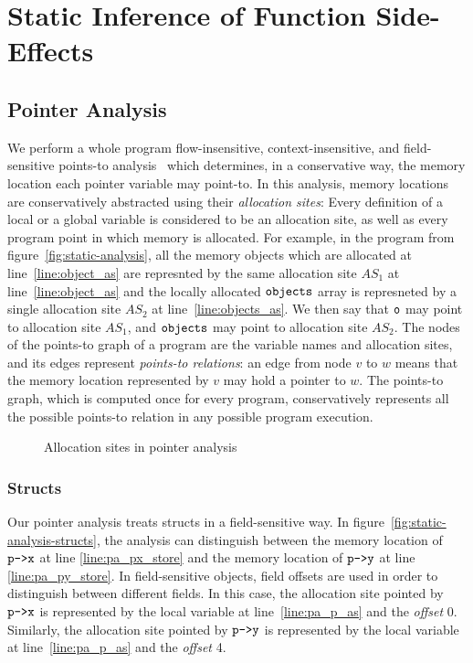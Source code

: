 
\section{Static Inference of Function Side-Effects}
\label{section:static-analysis}

\subsection{Pointer Analysis}
We perform a whole program flow-insensitive, context-insensitive, and field-sensitive
points-to analysis~\cite{Hind:Paste2001, Smaragdakis:FTPL2015} which
determines, in a conservative way, the memory location each pointer
variable may point-to. In this analysis, memory locations are
conservatively abstracted using their \emph{allocation sites}: Every
definition of a local or a global variable is considered to be an
allocation site, as well as every program point in which memory is
allocated.
For example, in the program from figure~\ref{fig:static-analysis},
all the memory objects which are allocated at line~\ref{line:object_as}
are represnted by the same allocation site $\mathit{AS_1}$ at line~\ref{line:object_as}
and the locally allocated $\texttt{objects}$ array is represneted
by a single allocation site $\mathit{AS_2}$ at line~\ref{line:objects_as}.
We then say that $\texttt{o}$ may point to allocation
site $\mathit{AS_1}$, and $\texttt{objects}$ may point to allocation site $\mathit{AS_2}$.
The nodes of the points-to graph of a
program are the variable names and allocation sites, and its edges
represent \emph{points-to relations}:
an edge from node $v$ to $w$ means that the memory location
represented by $v$ may hold a pointer to $w$.
The points-to graph, which is computed once for every program,
conservatively represents all the possible points-to relation in any
possible program execution. 

\begin{figure*}[t]
  \centering
  \subfloat[]{
    
    \label{fig:static-analysis}
  }
  \caption{Allocation sites in pointer analysis}
  \label{fig:simple}
\end{figure*}

\subsubsection{Structs}
Our pointer analysis treats structs in a field-sensitive way.
In figure~\ref{fig:static-analysis-structs},
the analysis can distinguish between the memory location of $\texttt{p->x}$ at line \ref{line:pa_px_store}
and the memory location of $\texttt{p->y}$ at line \ref{line:pa_py_store}.
In field-sensitive objects, field offsets are used in order to distinguish between different fields.
In this case, the allocation site pointed by $\texttt{p->x}$ is represented by
the local variable at line~\ref{line:pa_p_as} and the \textit{offset} 0.
Similarly, the allocation site pointed by $\texttt{p->y}$ is represented by
the local variable at line~\ref{line:pa_p_as} and the \textit{offset} 4.

